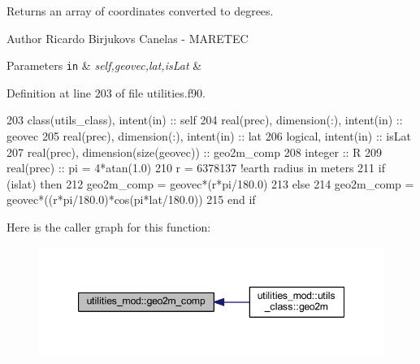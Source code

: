 Returns an array of coordinates converted to degrees. 

\begin{DoxyAuthor}{Author}
Ricardo Birjukovs Canelas -\/ M\+A\+R\+E\+T\+EC 
\end{DoxyAuthor}

\begin{DoxyParams}[1]{Parameters}
\mbox{\tt in}  & {\em self,geovec,lat,is\+Lat} & \\
\hline
\end{DoxyParams}


Definition at line 203 of file utilities.\+f90.


\begin{DoxyCode}
203     \textcolor{keywordtype}{class}(utils\_class), \textcolor{keywordtype}{intent(in)} :: self
204     \textcolor{keywordtype}{real(prec)}, \textcolor{keywordtype}{dimension(:)}, \textcolor{keywordtype}{intent(in)} :: geovec
205     \textcolor{keywordtype}{real(prec)}, \textcolor{keywordtype}{dimension(:)}, \textcolor{keywordtype}{intent(in)} :: lat
206     \textcolor{keywordtype}{logical}, \textcolor{keywordtype}{intent(in)} :: isLat
207     \textcolor{keywordtype}{real(prec)}, \textcolor{keywordtype}{dimension(size(geovec))} :: geo2m\_comp
208     \textcolor{keywordtype}{integer} :: R
209     \textcolor{keywordtype}{real(prec)} :: pi = 4*atan(1.0)
210     r = 6378137 \textcolor{comment}{!earth radius in meters}
211     \textcolor{keywordflow}{if} (islat) \textcolor{keywordflow}{then}
212         geo2m\_comp = geovec*(r*pi/180.0)
213     \textcolor{keywordflow}{else}
214         geo2m\_comp = geovec*((r*pi/180.0)*cos(pi*lat/180.0))
215 \textcolor{keywordflow}{    end if}
\end{DoxyCode}
Here is the caller graph for this function\+:\nopagebreak
\begin{figure}[H]
\begin{center}
\leavevmode
\includegraphics[width=347pt]{namespaceutilities__mod_a063ca10c2c57dc186ad0db0337fef4f9_icgraph}
\end{center}
\end{figure}
\mbox{\label{namespaceutilities__mod_a58dd5ed30b8ee9b9e1b43af96c119d28}} 
